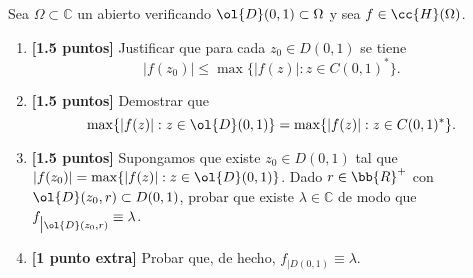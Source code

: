 \documentclass[12pt]{article}
\begin{document}
    \begin{ejercicio}
        Sea $\Omega \subset \mathbb{C}$ un abierto verificando $\ol{D}(0, 1) \subset \Omega$ y sea $f \in \cc{H}(\Omega)$.
        \begin{enumerate}
            \item\textbf{[1.5 puntos]} Justificar que para cada $z_0 \in D(0, 1)$ se tiene
            \begin{equation*}
                |f(z_0)| \leq \max\{|f(z)| : z \in C(0, 1)^*\}.
            \end{equation*}

            \begin{comment}

            Para cada $z_0\in D(0,1)$, podemos aplicar la Fórmula de Cauchy para la circunferencia:
            \begin{align*}
                |f(z_0)| &= \frac{1}{2\pi |i|} \left| \int_{C(0, 1)} \frac{f(z)}{z - z_0} dz \right|\leq \dfrac{2\pi}{2\pi}\cdot \sup\left\{\dfrac{|f(z)|}{|z-z_0|} : z \in C(0, 1)^*\right\}
            \end{align*}

            \begin{equation*}
                \dfrac{|f(z)|}{|z-z_0|}\leq |f(z)|\iff 1\leq |z-z_0|
            \end{equation*}

            Como la parametrización de $C(0,1)$ es en el compacto $[-\pi,\pi]$ y es una función continua, entonces $C(0,1)^*$ es compacto. Como $f$ es continua, entonces se alcanza dicho supremo, por lo que:
            \begin{align*}
                |f(z_0)| &\leq \max\{|f(z)| : z \in C(0, 1)^*\}
            \end{align*}
            \end{comment}

            \item\textbf{[1.5 puntos]} Demostrar que
            \begin{equation*}
                \max\{|f(z)| : z \in \ol{D}(0, 1)\} = \max\{|f(z)| : z \in C(0, 1)^*\}.
            \end{equation*}

            \item\textbf{[1.5 puntos]} Supongamos que existe $z_0 \in D(0, 1)$ tal que $|f(z_0)| = \max\{|f(z)| : z \in \ol{D}(0, 1)\}$. Dado $r\in \bb{R}^+$ con $\ol{D}(z_0, r) \subset D(0, 1)$, probar que existe $\lambda \in \mathbb{C}$ de modo que $f_{\big| \ol{D}(z_0, r)} \equiv \lambda$.
            
            \item\textbf{[1 punto extra]} Probar que, de hecho, $f_{\big| D(0, 1)} \equiv \lambda$.
        \end{enumerate}
    \end{ejercicio}
\end{document}

